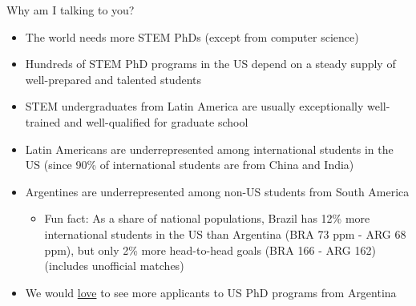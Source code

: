 \begin{frame}[fragile]{Why am I talking to you?}

\begin{itemize}
    \item The world needs more STEM PhDs (except from computer science) 
    \item Hundreds of STEM PhD programs in the US depend on a steady supply of well-prepared and talented students
    \item STEM undergraduates from Latin America are usually exceptionally well-trained and well-qualified for graduate school
    \item Latin Americans are underrepresented among international students in the US (since 90\% of international students are from China and India)
    \item Argentines are underrepresented among non-US students from South America
    \begin{itemize}
        \item Fun fact: As a share of national populations, Brazil has 12\% more international students in the US than Argentina (BRA 73 ppm - ARG 68 ppm), but only 2\% more head-to-head goals (BRA 166 - ARG 162) (includes unofficial matches)
    \end{itemize}
    \item We would \ul{love} to see more applicants to US PhD programs from Argentina
\end{itemize}
\end{frame}

